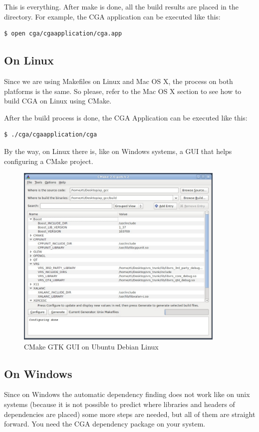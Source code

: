 This is everything. After make is done, all the build results are placed in the  directory. For example, the CGA application can be executed like this:
\begin{verbatim}
$ open cga/cgaapplication/cga.app
\end{verbatim}

\subsection{On Linux} Since we are using Makefiles on Linux and Mac OS X, the process on both platforms is the same. So please, refer to the Mac OS X section to see how to build CGA on Linux using CMake.

After the build process is done, the CGA Application can be executed like this:
\begin{verbatim}
$ ./cga/cgaapplication/cga
\end{verbatim}

By the way, on Linux there is, like on Windows systems, a GUI that helps configuring a CMake project.

\begin{figure}[ht]
\centering
\includegraphics[width=10cm]{images/cmake_gui_linux}
\caption{CMake GTK GUI on Ubuntu Debian Linux}\label{fig:cmake_gui_linux}
\end{figure}


\subsection{On Windows}
Since on Windows the automatic dependency finding does not work like on unix systems (because it is not possible to predict where libraries and headers of dependencies are placed) some more steps are needed, but all of them are straight forward. You need the CGA dependency package on your system.

